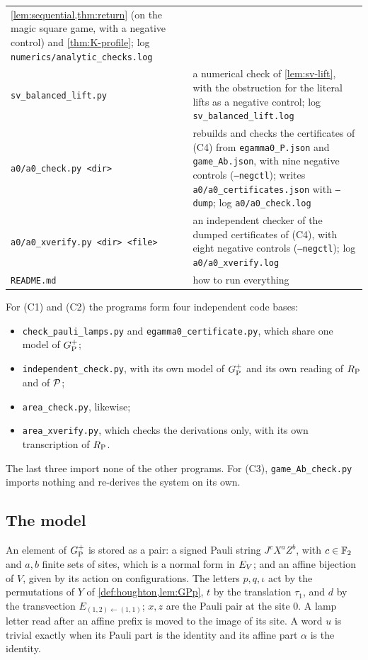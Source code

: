 \begin{longtable}{@{}p{}p{}@{}}
\cref{lem:sequential,thm:return} (on the magic square game, with a negative control) and \cref{thm:K-profile}; log
\texttt{numerics/analytic\_checks.log} \tabularnewline
\texttt{sv\_balanced\_lift.py} & \raggedright a numerical check of \cref{lem:sv-lift}, with the obstruction for the literal lifts as a
negative control; log \texttt{sv\_balanced\_lift.log} \tabularnewline
\texttt{a0/a0\_check.py <dir>} & \raggedright rebuilds and checks the certificates of (C4) from \texttt{egamma0\_P.json} and
\texttt{game\_Ab.json}, with nine negative controls (\texttt{--negctl}); writes \texttt{a0/a0\_certificates.json} with
\texttt{--dump}; log \texttt{a0/a0\_check.log} \tabularnewline
\texttt{a0/a0\_xverify.py <dir> <file>} & \raggedright an independent checker of the dumped certificates of (C4), with eight negative
controls (\texttt{--negctl}); log \texttt{a0/a0\_xverify.log} \tabularnewline
\texttt{README.md} & how to run everything \\
\end{longtable}
\endgroup

For (C1) and (C2) the programs form four independent code bases:
\begin{itemize}[itemsep=0pt]
\item \texttt{check\_pauli\_lamps.py} and \texttt{egamma0\_certificate.py}, which share one model of $G_{\mathrm P}^{+}$;
\item \texttt{independent\_check.py}, with its own model of $G_{\mathrm P}^{+}$ and its own reading of $R_{\mathrm P}$ and of $\mathcal P$;
\item \texttt{area\_check.py}, likewise;
\item \texttt{area\_xverify.py}, which checks the derivations only, with its own transcription of $R_{\mathrm P}$.
\end{itemize}
The last three import none of the other programs. For (C3), \texttt{game\_Ab\_check.py} imports nothing and re-derives the system on its
own.

\subsection{The model}\label{cert:model}

An element of $G_{\mathrm P}^{+}$ is stored as a pair: a signed Pauli string $J^cX^aZ^b$, with $c\in\mathbb F_2$ and $a,b$ finite sets of sites, which is a normal form
in $E_V$; and an affine bijection of $V$, given by its action on configurations. The letters $p,q,\iota$ act by the permutations of $Y$ of
\cref{def:houghton,lem:GPp}, $t$ by the translation $\tau_1$, and $d$ by the transvection $E_{(1,2)\leftarrow(1,1)}$; $x,z$ are the Pauli pair
at the site $0$. A lamp letter read after an affine prefix is moved to the image of its site. A word $u$ is trivial exactly when its Pauli
part is the identity and its affine part $\alpha$ is the identity.

